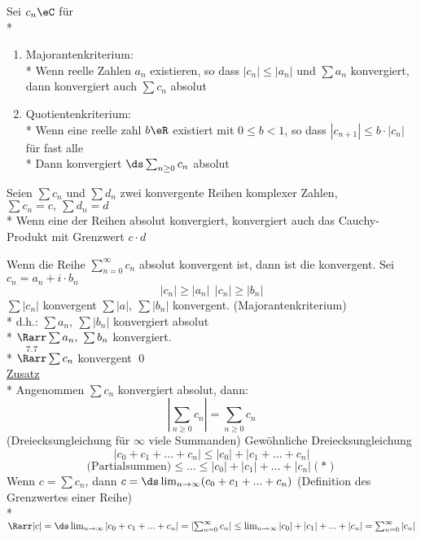 Sei $c_n\eC$ für \nN\\*
\begin{enumerate}
\item{Majorantenkriterium:\\*
Wenn reelle Zahlen $a_n$ existieren, so dass $|c_n|\leq |a_n|$ und $\sum a_n$ konvergiert, dann konvergiert auch $\sum c_n$ absolut}
\item{Quotientenkriterium:\\*
Wenn eine reelle zahl $b\eR$ existiert mit $0\leq b<1$, so dass $|c_{n+1}|\leq b·|c_n|$ für fast alle \nN\\*
Dann konvergiert $\ds\sum_{n\geq 0} c_n$ absolut}
\end{enumerate}

Seien $\sum c_n$ und $\sum d_n$ zwei konvergente Reihen komplexer Zahlen, $\sum c_n=c,\ \sum d_n=d$\\*
Wenn eine der Reihen absolut konvergiert, konvergiert auch das Cauchy-Produkt mit Grenzwert $c·d$

Wenn die Reihe $\sum_{n = 0}^{\infty} c_n$ absolut konvergent ist, dann ist die konvergent.
\bew
Sei $c_n = a_n + i \cdot b_n$ $$|c_n| \geq |a_n|\ \ |c_n| \geq |b_n|$$
$\sum |c_n|$ konvergent \Rarr $\sum |a|,\ \sum |b_n|$ konvergent. (Majorantenkriterium)\\*
d.h.: $\sum a_n,\ \sum |b_n|$ konvergiert absolut\\*
$\Rarr \sum a_n,\ \sum b_n$ konvergiert.\\*
$\overset{7.7}{\Rarr} \sum c_n$ konvergent \qed\\
\ul{Zusatz}\\*
Angenommen $\sum c_n$ konvergiert absolut, dann: 
$$\left| \sum_{n \geq 0} c_n \right| = \sum_{n \geq 0} c_n$$
(Dreiecksungleichung für $\infty$ viele Summanden)
\bew
Gewöhnliche Dreiecksungleichung \Rarr
$$|c_0 + c_1 + ... + c_n| \leq |c_0| + |c_1 + ... + c_n|$$
$$\text{(Partialsummen)} \leq ... \leq |c_0| + |c_1| + ... + |c_n| (*)$$
Wenn $c = \sum c_n$, dann $c = \ds\lim_{n \to \infty} (c_0 + c_1 + ... + c_n)$ (Definition des Grenzwertes einer Reihe)\\*
$\Rarr |c| = \ds\lim_{n \to \infty} |c_0 + c_1 + ... + c_n| = \left| \sum_{n = 0}^{\infty} c_n \right| \leq \lim_{n \to \infty} |c_0| + |c_1| + ... + |c_n| = \sum_{n = 0}^{\infty} |c_n|$
